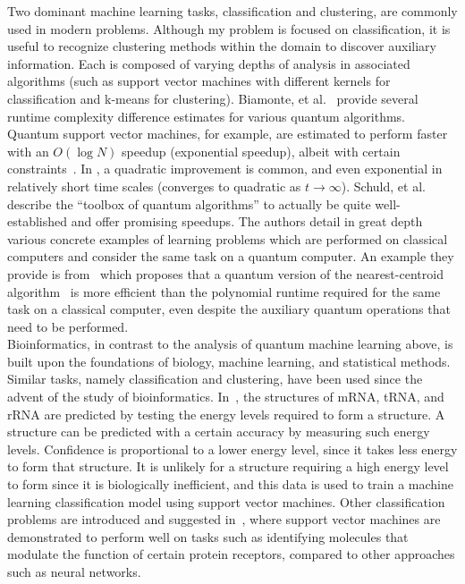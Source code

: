 \documentclass{article}
\begin{document}
  Two dominant machine learning tasks, classification and clustering, are commonly used in modern problems. Although my problem is focused on classification, it is useful to recognize clustering methods within the domain to discover auxiliary information. Each is composed of varying depths of analysis in associated algorithms (such as support vector machines with different kernels for classification and k-means for clustering). Biamonte, et al.~\cite{biamonte} provide several runtime complexity difference estimates for various quantum algorithms. Quantum support vector machines, for example, are estimated to perform faster with an $O(\log{N})$ speedup (exponential speedup), albeit with certain constraints~\cite{aaronson}. In \cite{dunjko}, a quadratic improvement is common, and even exponential in relatively short time scales (converges to quadratic as $t \rightarrow \infty$). Schuld, et al.~\cite{schuld} describe the ``toolbox of quantum algorithms'' to actually be quite well-established and offer promising speedups. The authors detail in great depth various concrete examples of learning problems which are performed on classical computers and consider the same task on a quantum computer. An example they provide is from~\cite{lloyd} which proposes that a quantum version of the nearest-centroid algorithm~\cite{centroid} is more efficient than the polynomial runtime required for the same task on a classical computer, even despite the auxiliary quantum operations that need to be performed. \\

  Bioinformatics, in contrast to the analysis of quantum machine learning above, is built upon the foundations of biology, machine learning, and statistical methods. Similar tasks, namely classification and clustering, have been used since the advent of the study of bioinformatics. In~\cite{ward}, the structures of mRNA, tRNA, and rRNA are predicted by testing the energy levels required to form a structure. A structure can be predicted with a certain accuracy by measuring such energy levels. Confidence is proportional to a lower energy level, since it takes less energy to form that structure. It is unlikely for a structure requiring a high energy level to form since it is biologically inefficient, and this data is used to train a machine learning classification model using support vector machines. Other classification problems are introduced and suggested in~\cite{byvatov}, where support vector machines are demonstrated to perform well on tasks such as identifying molecules that modulate the function of certain protein receptors, compared to other approaches such as neural networks. \\
\end{document}
